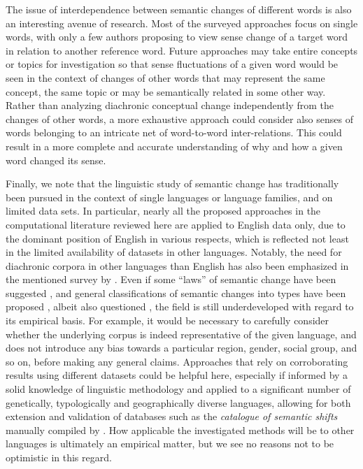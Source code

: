 \documentclass[output=paper]{langsci/langscibook}
\begin{document}
The issue of interdependence between semantic changes of different words is also an interesting avenue of research. Most of the surveyed approaches focus on single words, with only a few authors proposing to view sense change of a target word in relation to another reference word. Future approaches may take entire concepts or topics for investigation so that sense fluctuations of a given word would be seen in the context of changes of other words that may represent the same concept, the same topic or may be semantically related in some other way. Rather than analyzing diachronic conceptual change independently from the changes of other words, a more exhaustive approach could consider also senses of words belonging to an intricate net of word-to-word inter-relations. This could result in a more complete and accurate understanding of why and how a given word changed its sense.

Finally, we note that the linguistic study of semantic change has
traditionally been pursued in the context of single languages or
language families, and on limited data sets. In particular, nearly all the proposed approaches in the computational literature reviewed here are applied to English data only, due to the dominant position of English in various respects, which is reflected not least in the limited availability of datasets in other languages. Notably, the need for diachronic corpora in other languages than English has also been emphasized in the mentioned survey by \citet{tang-2018}.
Even if some ``laws'' of semantic change have been suggested \citep[e.g.,][]{wilkins,traugott2001regularity}, and general classifications of semantic changes into types have been proposed \citep[see][]{urban-2015}, albeit also questioned \citep[see][]{fortson-2003}, the field is still underdeveloped with regard to its empirical basis. For example, it would be necessary to carefully consider whether the underlying corpus is indeed representative of the given language, and does not introduce any bias towards a particular region, gender, social group, and so on, before making any general claims. Approaches that rely on corroborating results using different datasets could be helpful here, especially if informed by a solid knowledge of linguistic methodology and applied to a significant number of genetically, typologically and geographically diverse languages, allowing for both extension and validation of databases such as the \emph{catalogue of semantic shifts} manually compiled by \citet{zalizniak-etal-2012}. How applicable the investigated methods will be to other languages is ultimately an empirical matter, but we see no reasons not to be optimistic in this regard.
\end{document}
